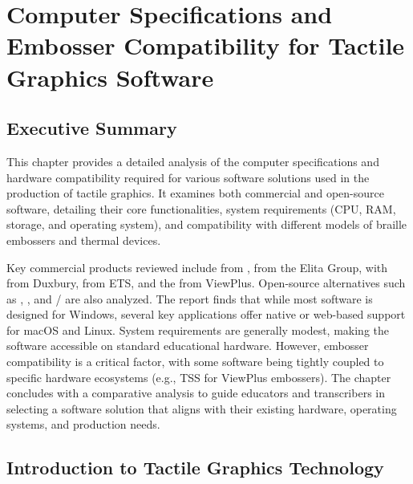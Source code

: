 \chapter{Computer Specifications and Embosser Compatibility for Tactile Graphics Software}\label{ch14:tactile-graphics-specs}
\raggedright

\section{Executive Summary}\label{ch14:sec:executive-summary}
This chapter provides a detailed analysis of the computer specifications and hardware compatibility required for various software solutions used in the production of tactile graphics. It examines both commercial and open-source software, detailing their core functionalities, system requirements (CPU, RAM, storage, and operating system), and compatibility with different models of braille embossers and thermal devices.

Key commercial products reviewed include  from ,  from the Elita Group,  with  from Duxbury,  from ETS, and the  from ViewPlus. Open-source alternatives such as , , and / are also analyzed. The report finds that while most software is designed for Windows, several key applications offer native or web-based support for macOS and Linux. System requirements are generally modest, making the software accessible on standard educational hardware. However, embosser compatibility is a critical factor, with some software being tightly coupled to specific hardware ecosystems (e.g., TSS for ViewPlus embossers). The chapter concludes with a comparative analysis to guide educators and transcribers in selecting a software solution that aligns with their existing hardware, operating systems, and production needs.

\section{Introduction to Tactile Graphics Technology}\label{ch14:sec:introduction}
